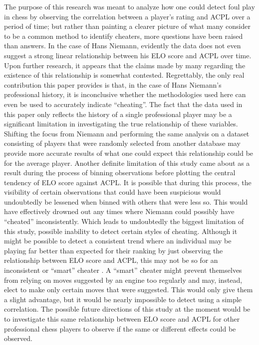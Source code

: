 \documentclass[12pt, letterpaper, titlepage]{article}
\begin{document}
The purpose of this research was meant to analyze how one could detect foul play in chess by observing the correlation between a player's rating and ACPL over a period of time; but rather than painting a clearer picture of what many consider to be a common method to identify cheaters, more questions have been raised than answers. In the case of Hans Niemann, evidently the data does not even suggest a strong linear relationship between his ELO score and ACPL over time. Upon further research, it appears that the claims made by many regarding the existence of this relationship is somewhat contested. Regrettably, the only real contribution this paper provides is that, in the case of Hans Niemann's professional history, it is inconclusive whether the methodologies used here can even be used to accurately indicate “cheating”. The fact that the data used in this paper only reflects the history of a single professional player may be a significant limitation in investigating the true relationship of these variables. Shifting the focus from Niemann and performing the same analysis on a dataset consisting of players that were randomly selected from another database may provide more accurate results of what one could expect this relationship could be for the average player. Another definite limitation of this study came about as a result during the process of binning observations before plotting the central tendency of ELO score against ACPL. It is possible that during this process, the visibility of certain observations that could have been suspicious would undoubtedly be lessened when binned with others that were less so. This would have effectively drowned out any times where Niemann could possibly have “cheated” inconsistently. Which leads to undoubtedly the biggest limitation of this study, possible inability to detect certain styles of cheating. Although it might be possible to detect a consistent trend where an individual may be playing far better than expected for their ranking by just observing the relationship between ELO score and ACPL, this may not be so for an inconsistent or “smart” cheater \citep{chessbot}. A “smart” cheater might prevent themselves from relying on moves suggested by an engine too regularly and may, instead, elect to make only certain moves that were suggested. This would only give them a slight advantage, but it would be nearly impossible to detect using a simple correlation. The possible future directions of this study at the moment would be to investigate this same relationship between ELO score and ACPL for other professional chess players to observe if the same or different effects could be observed.
\end{document}

